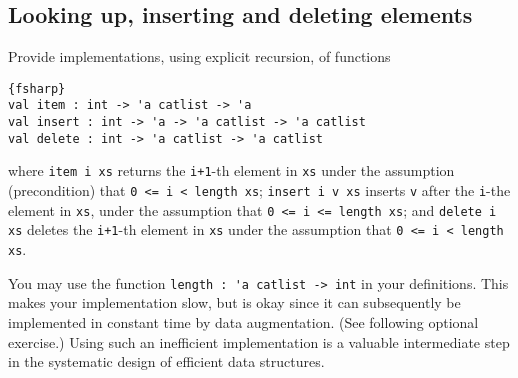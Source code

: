 \subsection*{Looking up, inserting and deleting elements}

Provide implementations, using explicit recursion, of functions
\begin{lstlisting}{fsharp}
val item : int -> 'a catlist -> 'a
val insert : int -> 'a -> 'a catlist -> 'a catlist
val delete : int -> 'a catlist -> 'a catlist
\end{lstlisting}
where \verb|item i xs| returns the \verb|i+1|-th element in \verb|xs| under the assumption (precondition) that \verb|0 <= i < length xs|;
\verb|insert i v xs| inserts \verb|v| after the \verb|i|-the element in \verb|xs|, under the assumption that \verb|0 <= i <= length xs|;
and \verb|delete i xs| deletes the \verb|i+1|-th element in \verb|xs| under the assumption that \verb|0 <= i < length xs|.

You may use the function \verb|length : 'a catlist -> int| in your definitions. This makes your implementation slow, but is okay since it can subsequently be implemented in constant time by data augmentation. (See following optional exercise.)  Using such an inefficient implementation is a valuable intermediate step in the systematic design of efficient data structures.
